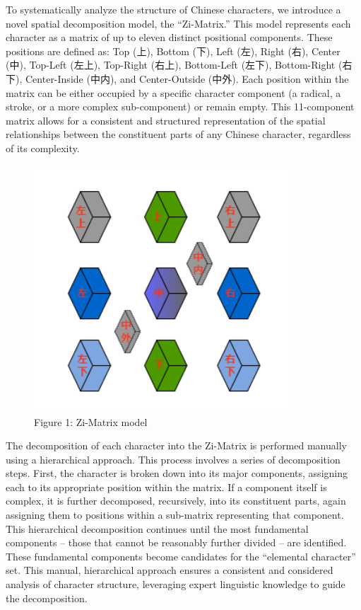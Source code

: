 \documentclass[
  11pt,
  letterpaper,
]{article}
\begin{document}
To systematically analyze the structure of Chinese characters, we
introduce a novel spatial decomposition model, the ``Zi-Matrix.'' This
model represents each character as a matrix of up to eleven distinct
positional components. These positions are defined as: Top (上), Bottom
(下), Left (左), Right (右), Center (中), Top-Left (左上), Top-Right
(右上), Bottom-Left (左下), Bottom-Right (右下), Center-Inside (中内),
and Center-Outside (中外). Each position within the matrix can be either
occupied by a specific character component (a radical, a stroke, or a
more complex sub-component) or remain empty. This 11-component matrix
allows for a consistent and structured representation of the spatial
relationships between the constituent parts of any Chinese character,
regardless of its complexity.

\begin{figure}
\centering
\includegraphics[width=0.85\textwidth]{./images/zi-matrix-CHN.png}
\caption{Figure 1: Zi-Matrix model}
\end{figure}

The decomposition of each character into the Zi-Matrix is performed
manually using a hierarchical approach. This process involves a series
of decomposition steps. First, the character is broken down into its
major components, assigning each to its appropriate position within the
matrix. If a component itself is complex, it is further decomposed,
recursively, into its constituent parts, again assigning them to
positions within a sub-matrix representing that component. This
hierarchical decomposition continues until the most fundamental
components -- those that cannot be reasonably further divided -- are
identified. These fundamental components become candidates for the
``elemental character'' set. This manual, hierarchical approach ensures
a consistent and considered analysis of character structure, leveraging
expert linguistic knowledge to guide the decomposition.
\end{document}
